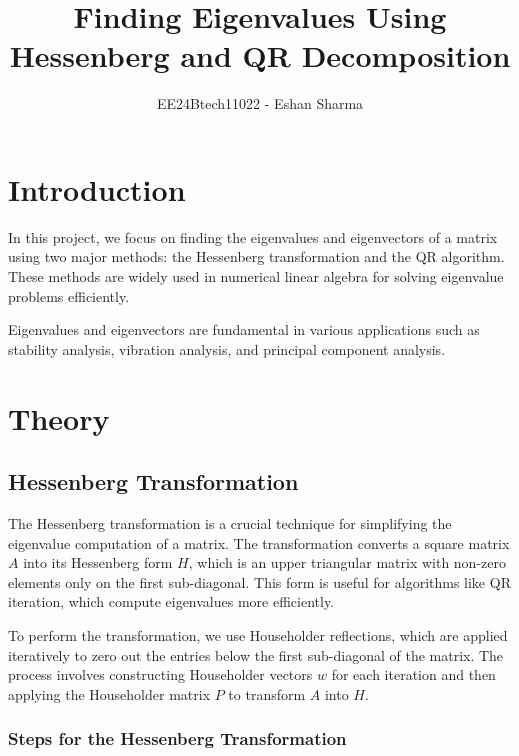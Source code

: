 \documentclass[journal,12pt,onecolumn]{IEEEtran}
\theoremstyle{remark}
\begin{document}
	
	\vspace{3cm}
	
	\title{Finding Eigenvalues Using Hessenberg and QR Decomposition}
	\author{EE24Btech11022 - Eshan Sharma}
	\maketitle
	
	\renewcommand{\thefigure}{\theenumi}
	\renewcommand{\thetable}{\theenumi}
	
	\section{Introduction}
	In this project, we focus on finding the eigenvalues and eigenvectors of a matrix using two major methods: the Hessenberg transformation and the QR algorithm. These methods are widely used in numerical linear algebra for solving eigenvalue problems efficiently. 
	
	Eigenvalues and eigenvectors are fundamental in various applications such as stability analysis, vibration analysis, and principal component analysis.
	
	\section{Theory}
\subsection{Hessenberg Transformation}

The Hessenberg transformation is a crucial technique for simplifying the eigenvalue computation of a matrix. The transformation converts a square matrix \( A \) into its Hessenberg form \( H \), which is an upper triangular matrix with non-zero elements only on the first sub-diagonal. This form is useful for algorithms like QR iteration, which compute eigenvalues more efficiently.

To perform the transformation, we use Householder reflections, which are applied iteratively to zero out the entries below the first sub-diagonal of the matrix. The process involves constructing Householder vectors \( w \) for each iteration and then applying the Householder matrix \( P \) to transform \( A \) into \( H \). \\ 

\subsubsection*{Steps for the Hessenberg Transformation}
\end{document}
